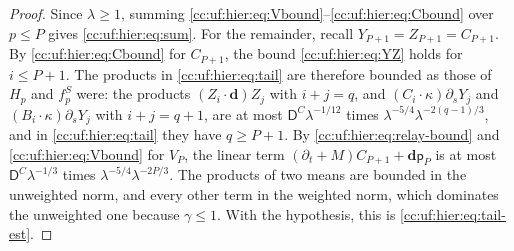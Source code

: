 \begin{proof}
Since $\lambda\ge1$, summing
\eqref{cc:uf:hier:eq:Vbound}--\eqref{cc:uf:hier:eq:Cbound} over
$p\le P$ gives \eqref{cc:uf:hier:eq:sum}. For the remainder,
recall $Y_{P+1}=Z_{P+1}=C_{P+1}$. By \eqref{cc:uf:hier:eq:Cbound} for
$C_{P+1}$, the bound \eqref{cc:uf:hier:eq:YZ} holds for $i\le P+1$. The
products in \eqref{cc:uf:hier:eq:tail} are therefore bounded as those
of $H_p$ and $f_p^S$ were: the products $(Z_i\cdot\mathbf d)Z_j$ with
$i+j=q$, and $(C_i\cdot\kappa)\partial_sY_j$ and
$(B_i\cdot\kappa)\partial_sY_j$ with $i+j=q+1$, are at most
$\mathsf D^C\lambda^{-1/12}$ times $\lambda^{-5/4}\lambda^{-2(q-1)/3}$,
and in \eqref{cc:uf:hier:eq:tail} they have $q\ge P+1$. By
\eqref{cc:uf:hier:eq:relay-bound} and \eqref{cc:uf:hier:eq:Vbound} for
$V_P$, the linear term
\((\partial_t+M)C_{P+1}+\mathbf d\mathsf p_P\) is at most
$\mathsf D^C\lambda^{-1/3}$ times $\lambda^{-5/4}\lambda^{-2P/3}$. The
products of two means are bounded in the
unweighted norm, and every other term in the weighted norm, which
dominates the unweighted one because $\gamma\le1$. With the hypothesis,
this is \eqref{cc:uf:hier:eq:tail-est}.
\end{proof}
